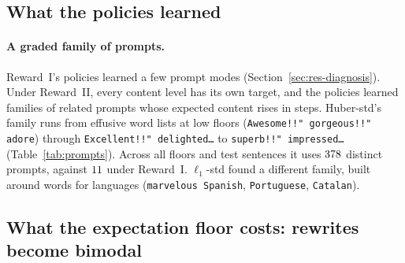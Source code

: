 \subsection{What the policies learned}
\label{sec:res-prompts}

\begin{table}[t]
\centering
\setlength{\tabcolsep}{4pt}

\caption{The most frequent prompt each Reward~II policy emits at five floors,
across the $\wNsent$ test sentences, with the share of sentences that receive
it (prompts are sampled). Decoded with the policy's tokenizer and shown
verbatim. \texttt{[RLO]} is an invisible right-to-left-override character
(U+202E), \texttt{\textbackslash n} a newline, and \texttt{[U+\dots]} other
non-ASCII characters by code point (e.g.\ U+304C is the Japanese kana
\emph{ga}).}
\label{tab:prompts}
\end{table}

\paragraph{A graded family of prompts.}
Reward~I's policies learned a few prompt modes (Section~\ref{sec:res-diagnosis}).
Under Reward~II, every content level has its own target, and the policies
learned families of related prompts whose expected content rises in steps.
Huber-std's family runs from effusive word lists at low floors
(\texttt{Awesome!!" gorgeous!!" adore}) through \texttt{Excellent!!"
delighted\dots} to \texttt{superb!!" impressed\dots}
(Table~\ref{tab:prompts}). Across all floors and test sentences it uses
$378$ distinct prompts, against $11$ under
Reward~I. $\ell_1$-std found a different family, built around words for
languages (\texttt{marvelous Spanish}, \texttt{Portuguese}, \texttt{Catalan}).

\subsection{What the expectation floor costs: rewrites become bimodal}
\label{sec:res-cost}

\begin{table}[t]
\centering
\setlength{\tabcolsep}{3pt}

\caption{\textbf{One input, five floors, both rewards} (\rrebel{} Huber-std,
step $12{,}000$, test sentence $\exSrcIndex$). For each floor: the policy's most
likely prompt, the expected content and sentiment of its rewrites ($50$
task-model samples), the share of rewrites that are positive (sentiment
$\ge 50$), and one rewrite from each group: the one with the group's median
content, not the best one. Rewrites are lower-cased by the pipeline. Under
Reward~II the middle floors are met by a mixture of exact copies and short
positive sentences. Under Reward~I the same floors produce rewrites that
change the sentiment and keep the content.}
\label{tab:example}
\end{table}

